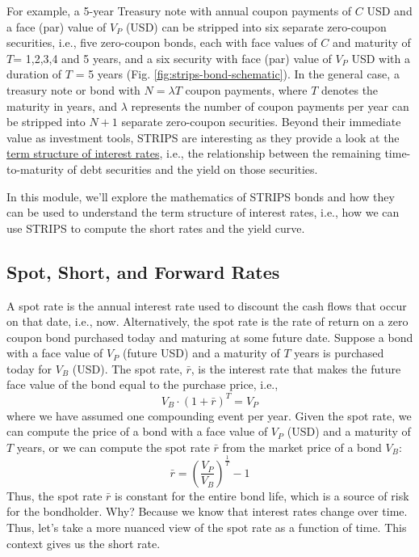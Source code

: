 \documentclass[11pt]{article}
\theoremstyle{definition}
\begin{document}
For example, a 5-year Treasury note with annual coupon payments of $C$ USD and a face (par) value of $V_{P}$ (USD)
can be stripped into six separate zero-coupon securities, i.e., five zero-coupon bonds, each with face values of $C$ 
and maturity of $T$= 1,2,3,4 and 5 years, and a six security with face  (par) value of $V_{P}$ USD with a duration of $T$ = 5 years (Fig. \ref{fig:strips-bond-schematic}). 
In the general case, a treasury note or bond with $N=\lambda{T}$ coupon payments, where $T$ denotes the maturity in years, and $\lambda$ represents 
the number of coupon payments per year can be stripped into $N+1$ separate zero-coupon securities.
Beyond their immediate value as investment tools, STRIPS are interesting as they provide a look at the 
\href{https://www.federalreserve.gov/data/yield-curve-models.htm}{term structure of interest rates}, i.e., the relationship between the remaining time-to-maturity of debt securities 
and the yield on those securities.

In this module, we'll explore the mathematics of STRIPS bonds and how they can be used to understand the term structure of interest rates, i.e., how we can use STRIPS to compute the short rates and the yield curve.

\subsection{Spot, Short, and Forward Rates}
A spot rate is the annual interest rate used to discount the cash flows that occur on that date, i.e., now. Alternatively, the spot rate is the rate of return on a zero coupon bond purchased today and maturing at some future date. Suppose a bond with a face value of $V_{P}$ (future USD) and a maturity of $T$ years is purchased today for $V_{B}$ (USD). The spot rate, $\bar{r}$, is the interest rate that makes the future face value of the bond equal to the purchase price, i.e.,
\begin{equation}
V_{B}\cdot(1+\bar{r})^{T} = V_{P}
\end{equation}
where we have assumed one compounding event per year. Given the spot rate, we can compute the price of a bond with a face value of $V_{P}$ (USD) and a maturity of $T$ years, or we can compute the spot rate $\bar{r}$ from the market price of a bond $V_{B}$:
\begin{equation}
\bar{r} = \left(\frac{V_{P}}{V_{B}}\right)^{\frac{1}{T}}-1
\end{equation}
Thus, the spot rate $\bar{r}$ is constant for the entire bond life, which is a source of risk for the bondholder.
Why? Because we know that interest rates change over time. Thus, let's take a more nuanced view of the spot rate as a function of time. This context gives us the short rate.
\end{document}
